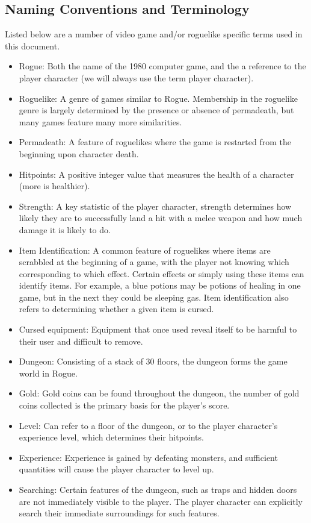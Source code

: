 \documentclass[12pt, titlepage]{article}
\begin{document}
	\subsection{Naming Conventions and Terminology}

	Listed below are a number of video game and/or roguelike specific terms used in this document. 
	\begin{itemize}
	\item Rogue: Both the name of the 1980 computer game, and the a reference to the player character (we will always use the term player character).
	\item Roguelike: A genre of games similar to Rogue. Membership in the roguelike genre is largely determined by the presence or absence of permadeath, but many games feature many more similarities.
	\item Permadeath: A feature of roguelikes where the game is restarted from the beginning upon character death.
	\item Hitpoints: A positive integer value that measures the health of a character (more is healthier).
	\item Strength: A key statistic of the player character, strength determines how likely they are to successfully land a hit with a melee weapon and how much damage it is likely to do.
	\item Item Identification: A common feature of roguelikes where items are scrabbled at the beginning of a game, with the player not knowing which corresponding to which effect. Certain effects or simply using these items can identify items. For example, a blue potions may be potions of healing in one game, but in the next they could be sleeping gas. Item identification also refers to determining whether a given item is cursed.
	\item Cursed equipment: Equipment that once used reveal itself to be harmful to their user and difficult to remove.
	\item Dungeon: Consisting of a stack of 30 floors, the dungeon forms the game world in Rogue.
	\item Gold: Gold coins can be found throughout the dungeon, the number of gold coins collected is the primary basis for the player's score.
	\item Level: Can refer to a floor of the dungeon, or to the player character's experience level, which determines their hitpoints.
	\item Experience: Experience is gained by defeating monsters, and sufficient quantities will cause the player character to level up.
	\item Searching: Certain features of the dungeon, such as traps and hidden doors are not immediately visible to the player. The player character can explicitly search their immediate surroundings for such features.
	\end{itemize}
\end{document}
